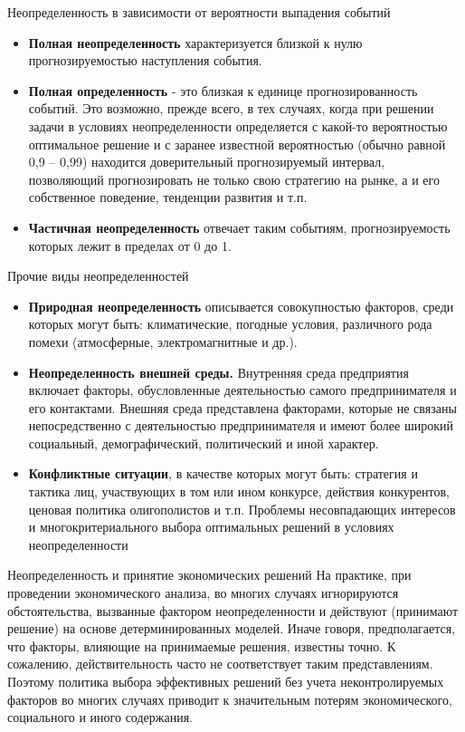 \documentclass[financial_risks_lectures.tex]{subfiles}
\begin{document}
\begin{frame}[allowframebreaks]{Неопределенность в зависимости от вероятности выпадения событий}
\begin{itemize}
\item
\textbf{Полная неопределенность }характеризуется близкой к нулю прогнозируемостью наступления события.
\item
\textbf{Полная определенность} - это близкая к единице прогнозированность событий.
Это возможно, прежде всего, в тех случаях, когда при решении задачи в условиях неопределенности определяется с какой-то вероятностью оптимальное решение и с заранее известной вероятностью (обычно равной 0,9 – 0,99) находится доверительный прогнозируемый интервал, позволяющий прогнозировать не только свою стратегию на рынке, а и его собственное поведение, тенденции развития и т.п.
\item
\textbf{Частичная неопределенность }отвечает таким событиям, прогнозируемость которых лежит в пределах от 0 до 1.
\end{itemize}
\end{frame}

\begin{frame}[allowframebreaks]{Прочие виды неопределенностей}
\begin{itemize}
\item
\textbf{Природная неопределенность }описывается совокупностью факторов, среди которых могут быть: климатические, погодные условия, различного рода помехи (атмосферные, электромагнитные и др.).
\item
\textbf{Неопределенность внешней среды.} Внутренняя среда предприятия включает факторы, обусловленные деятельностью самого предпринимателя и его контактами. Внешняя среда представлена факторами, которые не связаны непосредственно с деятельностью предпринимателя и имеют более широкий социальный, демографический, политический и иной характер.
\item
\textbf{Конфликтные ситуации}, в качестве которых могут быть: стратегия и тактика лиц, участвующих в том или ином конкурсе, действия конкурентов, ценовая политика олигополистов и т.п. Проблемы несовпадающих интересов и многокритериального выбора оптимальных решений в условиях неопределенности
\end{itemize}
\end{frame}

\begin{frame}{Неопределенность и принятие экономических решений}
На практике, при проведении экономического анализа, во многих случаях игнорируются обстоятельства, вызванные фактором неопределенности и действуют (принимают решение) на основе детерминированных моделей. Иначе говоря, предполагается, что факторы, влияющие на принимаемые решения, известны точно. К сожалению, действительность часто не соответствует таким представлениям. Поэтому политика выбора эффективных решений без учета неконтролируемых факторов во многих случаях приводит к значительным потерям экономического, социального и иного содержания.
\end{frame}
\end{document}
